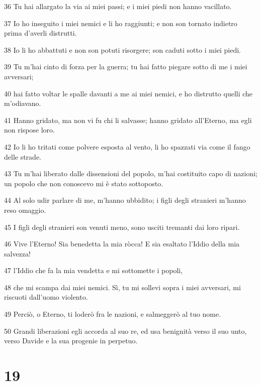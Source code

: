 \par 36 Tu hai allargato la via ai miei passi; e i miei piedi non hanno vacillato.
\par 37 Io ho inseguito i miei nemici e li ho raggiunti; e non son tornato indietro prima d'averli distrutti.
\par 38 Io li ho abbattuti e non son potuti risorgere; son caduti sotto i miei piedi.
\par 39 Tu m'hai cinto di forza per la guerra; tu hai fatto piegare sotto di me i miei avversari;
\par 40 hai fatto voltar le spalle davanti a me ai miei nemici, e ho distrutto quelli che m'odiavano.
\par 41 Hanno gridato, ma non vi fu chi li salvasse; hanno gridato all'Eterno, ma egli non rispose loro.
\par 42 Io li ho tritati come polvere esposta al vento, li ho spazzati via come il fango delle strade.
\par 43 Tu m'hai liberato dalle dissensioni del popolo, m'hai costituito capo di nazioni; un popolo che non conoscevo mi è stato sottoposto.
\par 44 Al solo udir parlare di me, m'hanno ubbidito; i figli degli stranieri m'hanno reso omaggio.
\par 45 I figli degli stranieri son venuti meno, sono usciti tremanti dai loro ripari.
\par 46 Vive l'Eterno! Sia benedetta la mia ròcca! E sia esaltato l'Iddio della mia salvezza!
\par 47 l'Iddio che fa la mia vendetta e mi sottomette i popoli,
\par 48 che mi scampa dai miei nemici. Sì, tu mi sollevi sopra i miei avversari, mi riscuoti dall'uomo violento.
\par 49 Perciò, o Eterno, ti loderò fra le nazioni, e salmeggerò al tuo nome.
\par 50 Grandi liberazioni egli accorda al suo re, ed usa benignità verso il suo unto, verso Davide e la sua progenie in perpetuo.

\chapter{19}


